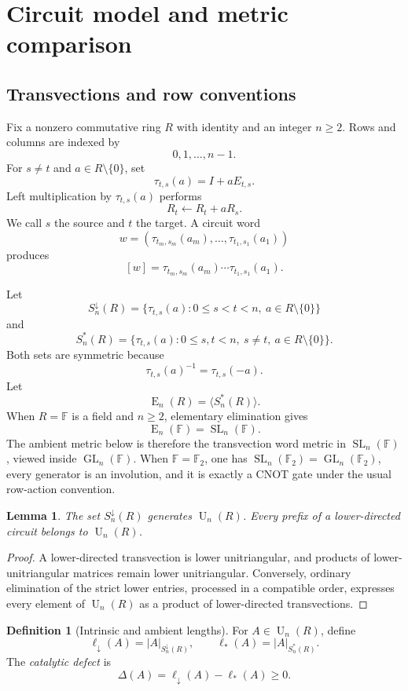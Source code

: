 \documentclass[11pt]{amsart}
\numberwithin{equation}{section}
\newtheorem{lemma}[theorem]{Lemma}
\theoremstyle{definition}
\newtheorem{definition}[theorem]{Definition}
\theoremstyle{remark}
\newcommand{\F}{\mathbb F}
\newcommand{\GL}{\operatorname{GL}}
\newcommand{\SL}{\operatorname{SL}}
\newcommand{\Egrp}{\operatorname{E}}
\newcommand{\U}{\operatorname{U}}
\newcommand{\ellDown}{\ell_{\downarrow}}
\newcommand{\ellAll}{\ell_{*}}
\newcommand{\DeltaDef}{\Delta}
\begin{document}
\section{Circuit model and metric comparison}\label{sec:model}

\subsection{Transvections and row conventions}

Fix a nonzero commutative ring $R$ with identity and an integer $n\ge2$.  Rows and columns are indexed by
\[
0,1,\ldots,n-1.
\]
For $s\ne t$ and $a\in R\setminus\{0\}$, set
\[
\tau_{t,s}(a)=I+aE_{t,s}.
\]
Left multiplication by $\tau_{t,s}(a)$ performs
\[
R_t\longleftarrow R_t+aR_s.
\]
We call $s$ the source and $t$ the target.  A circuit word
\[
w=(\tau_{t_m,s_m}(a_m),\ldots,\tau_{t_1,s_1}(a_1))
\]
produces
\[
[w]=\tau_{t_m,s_m}(a_m)\cdots\tau_{t_1,s_1}(a_1).
\]

Let
\[
S_n^\downarrow(R)
=\{\tau_{t,s}(a):0\le s<t<n,\ a\in R\setminus\{0\}\}
\]
and
\[
S_n^*(R)
=\{\tau_{t,s}(a):0\le s,t<n,\ s\ne t,\ a\in R\setminus\{0\}\}.
\]
Both sets are symmetric because
\[
\tau_{t,s}(a)^{-1}=\tau_{t,s}(-a).
\]
Let
\[
\Egrp_n(R)=\langle S_n^*(R)\rangle.
\]
When $R=\F$ is a field and $n\ge2$, elementary elimination gives
\[
\Egrp_n(\F)=\SL_n(\F).
\]
The ambient metric below is therefore the transvection word metric in $\SL_n(\F)$, viewed inside $\GL_n(\F)$.  When $\F=\F_2$, one has $\SL_n(\F_2)=\GL_n(\F_2)$, every generator is an involution, and it is exactly a CNOT gate under the usual row-action convention.

\begin{lemma}\label{lem:lower-generates}
The set $S_n^\downarrow(R)$ generates $\U_n(R)$.  Every prefix of a lower-directed circuit belongs to $\U_n(R)$.
\end{lemma}

\begin{proof}
A lower-directed transvection is lower unitriangular, and products of lower-unitriangular matrices remain lower unitriangular.  Conversely, ordinary elimination of the strict lower entries, processed in a compatible order, expresses every element of $\U_n(R)$ as a product of lower-directed transvections.
\end{proof}

\begin{definition}[Intrinsic and ambient lengths]\label{def:lengths}
For $A\in\U_n(R)$, define
\[
\ellDown(A)=|A|_{S_n^\downarrow(R)},
\qquad
\ellAll(A)=|A|_{S_n^*(R)}.
\]
The \emph{catalytic defect} is
\[
\DeltaDef(A)=\ellDown(A)-\ellAll(A)\ge0.
\]
\end{definition}
\end{document}
